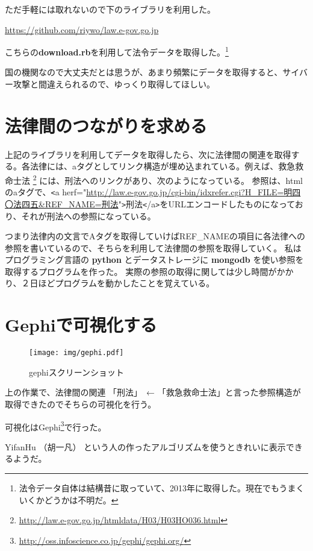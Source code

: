\documentclass[a5j,openany,twoside]{jsbook}
\begin{document}
ただ手軽には取れないので下のライブラリを利用した。

\url{https://github.com/riywo/law.e-gov.go.jp}

こちらの\textbf{download.rb}を利用して法令データを取得した。\footnote{法令データ自体は結構昔に取っていて、2013年に取得した。現在でもうまくいくかどうかは不明だ。}

国の機関なので大丈夫だとは思うが、あまり頻繁にデータを取得すると、サイバー攻撃と間違えられるので、ゆっくり取得してほしい。

\section{法律間のつながりを求める}

上記のライブラリを利用してデータを取得したら、次に法律間の関連を取得する。各法律には、aタグとしてリンク構造が埋め込まれている。例えば、救急救命士法 \footnote{\url{http://law.e-gov.go.jp/htmldata/H03/H03HO036.html}} には、刑法へのリンクがあり、次のようになっている。
参照は、htmlのaタグで、\verb|<|a herf="\url{http://law.e-gov.go.jp/cgi-bin/idxrefer.cgi?H_FILE=明四〇法四五&REF_NAME=刑法}"\verb|>|刑法\verb|<|/a\verb|>|をURLエンコードしたものになっており、それが刑法への参照になっている。

つまり法律内の文言でAタグを取得していけばREF\_NAMEの項目に各法律への参照を書いているので、そちらを利用して法律間の参照を取得していく。
私は プログラミング言語の \textbf{python} とデータストレージに \textbf{mongodb} を使い参照を取得するプログラムを作った。
実際の参照の取得に関しては少し時間がかかり、２日ほどプログラムを動かしたことを覚えている。

\section{Gephiで可視化する}

\begin{wrapfigure}{L}{70mm}
 \begin{center}
 \texttt{[image: img/gephi.pdf]}
 \caption{gephiスクリーンショット}
 \end{center}
\end{wrapfigure}

上の作業で、法律間の関連 「刑法」　← 「救急救命士法」と言った参照構造が取得できたのでそちらの可視化を行う。

可視化はGephi\footnote{\url{http://oss.infoscience.co.jp/gephi/gephi.org/}}で行った。

YifanHu （胡一凡） という人の作ったアルゴリズムを使うときれいに表示できるようだ。
\end{document}
